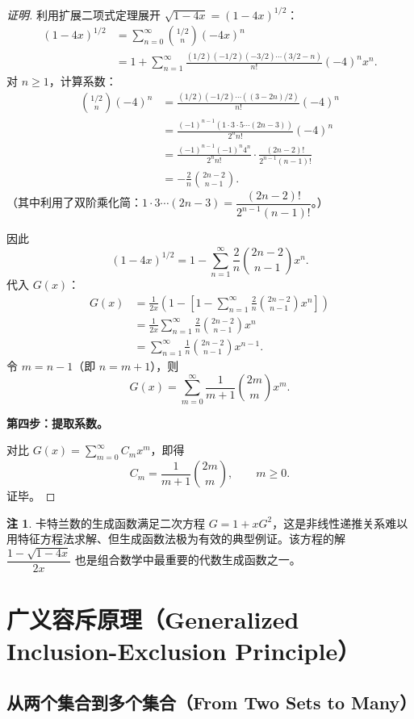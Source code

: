 \documentclass[UTF8,11pt,a4paper]{ctexbook}   %
\theoremstyle{definition}
\newtheorem{remark}{注}[section]
\begin{document}
\begin{proof}[证明]
利用扩展二项式定理展开 $\sqrt{1-4x}=(1-4x)^{1/2}$：
\begin{align*}
(1-4x)^{1/2} &= \sum_{n=0}^{\infty}\binom{1/2}{n}(-4x)^n \\
&= 1 + \sum_{n=1}^{\infty}\frac{(1/2)(-1/2)(-3/2)\cdots(3/2-n)}{n!}(-4)^n x^n.
\end{align*}
对 $n\ge 1$，计算系数：
\begin{align*}
\binom{1/2}{n}(-4)^n
&= \frac{(1/2)(-1/2)\cdots((3-2n)/2)}{n!}(-4)^n \\
&= \frac{(-1)^{n-1}(1\cdot 3\cdot 5\cdots(2n-3))}{2^n n!}(-4)^n \\
&= \frac{(-1)^{n-1}(-1)^n 4^n}{2^n n!}\cdot\frac{(2n-2)!}{2^{n-1}(n-1)!} \\
&= -\frac{2}{n}\binom{2n-2}{n-1}.
\end{align*}
（其中利用了双阶乘化简：$1\cdot 3\cdots(2n-3)=\dfrac{(2n-2)!}{2^{n-1}(n-1)!}$。）

因此
\[
(1-4x)^{1/2}=1-\sum_{n=1}^{\infty}\frac{2}{n}\binom{2n-2}{n-1}x^n.
\]
代入 $G(x)$：
\begin{align*}
G(x) &= \frac{1}{2x}\left(1-\left[1-\sum_{n=1}^{\infty}\frac{2}{n}\binom{2n-2}{n-1}x^n\right]\right) \\
&= \frac{1}{2x}\sum_{n=1}^{\infty}\frac{2}{n}\binom{2n-2}{n-1}x^n \\
&= \sum_{n=1}^{\infty}\frac{1}{n}\binom{2n-2}{n-1}x^{n-1}.
\end{align*}
令 $m=n-1$（即 $n=m+1$），则
\[
G(x)=\sum_{m=0}^{\infty}\frac{1}{m+1}\binom{2m}{m}x^m.
\]

\textbf{第四步：提取系数。}

对比 $G(x)=\sum_{m=0}^{\infty}C_m x^m$，即得
\[
C_m=\frac{1}{m+1}\binom{2m}{m},\qquad m\ge 0.
\]
证毕。
\end{proof}

\begin{remark}
卡特兰数的生成函数满足二次方程 $G=1+xG^2$，这是非线性递推关系难以用特征方程法求解、但生成函数法极为有效的典型例证。该方程的解 $\dfrac{1-\sqrt{1-4x}}{2x}$ 也是组合数学中最重要的代数生成函数之一。
\end{remark}

\section{广义容斥原理（Generalized Inclusion-Exclusion Principle）}

\subsection{从两个集合到多个集合（From Two Sets to Many）}
\end{document}
